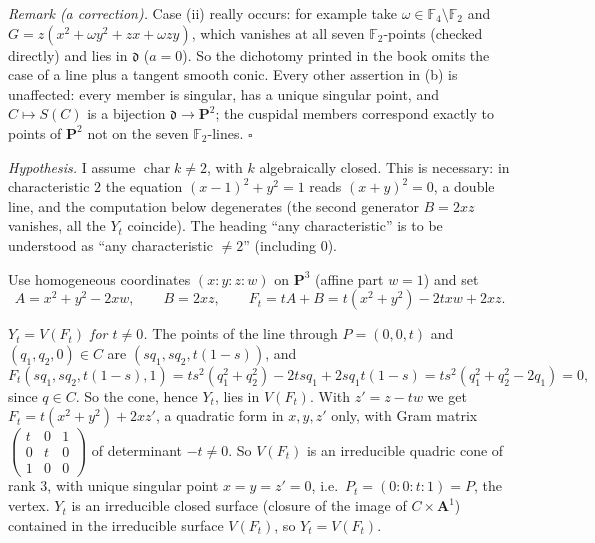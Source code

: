 \documentclass[11pt]{article}
\begin{document}
\emph{Remark (a correction).} Case (ii) really occurs: for example take $\omega\in\mathbb F_4\setminus\mathbb F_2$ and $G=z(x^2+\omega y^2+zx+\omega zy)$, which vanishes at all seven $\mathbb F_2$-points (checked directly) and lies in $\mathfrak d$ ($a=0$). So the dichotomy printed in the book omits the case of a line plus a tangent smooth conic. Every other assertion in (b) is unaffected: every member is singular, has a unique singular point, and $C\mapsto S(C)$ is a bijection $\mathfrak d\to\mathbf P^2$; the cuspidal members correspond exactly to points of $\mathbf P^2$ not on the seven $\mathbb F_2$-lines. \hfill$\square$

\pf
\emph{Hypothesis.} I assume $\operatorname{char}k\ne2$, with $k$ algebraically closed. This is necessary: in characteristic $2$ the equation $(x-1)^2+y^2=1$ reads $(x+y)^2=0$, a double line, and the computation below degenerates (the second generator $B=2xz$ vanishes, all the $Y_t$ coincide). The heading ``any characteristic'' is to be understood as ``any characteristic $\ne2$'' (including $0$).

Use homogeneous coordinates $(x:y:z:w)$ on $\mathbf P^3$ (affine part $w=1$) and set
\[
A=x^2+y^2-2xw,\qquad B=2xz,\qquad F_t=tA+B=t(x^2+y^2)-2txw+2xz .
\]

\emph{$Y_t=V(F_t)$ for $t\ne0$.} The points of the line through $P=(0,0,t)$ and $(q_1,q_2,0)\in C$ are $(sq_1,sq_2,t(1-s))$, and
\[
F_t(sq_1,sq_2,t(1-s),1)=ts^2(q_1^2+q_2^2)-2tsq_1+2sq_1t(1-s)=ts^2(q_1^2+q_2^2-2q_1)=0,
\]
since $q\in C$. So the cone, hence $Y_t$, lies in $V(F_t)$. With $z'=z-tw$ we get $F_t=t(x^2+y^2)+2xz'$, a quadratic form in $x,y,z'$ only, with Gram matrix $\begin{pmatrix}t&0&1\\0&t&0\\1&0&0\end{pmatrix}$ of determinant $-t\ne0$. So $V(F_t)$ is an irreducible quadric cone of rank $3$, with unique singular point $x=y=z'=0$, i.e.\ $P_t=(0:0:t:1)=P$, the vertex. $Y_t$ is an irreducible closed surface (closure of the image of $C\times\mathbf A^1$) contained in the irreducible surface $V(F_t)$, so $Y_t=V(F_t)$.
\end{document}
